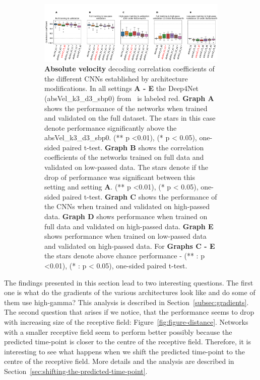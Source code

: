 \begin{itemize}
\begin{figure}[!htpb]
\begin{subfigure}[b]{\textwidth}
   \includegraphics[width=1\linewidth]{img/ch4/original_setting_absVel_performance_comparison}
   \caption{\textbf{Absolute velocity} decoding correlation coefficients of the different CNNs established by architecture modifications. In all settings \textbf{
   A - E} the Deep4Net (absVel\_k3\_d3\_sbp0) from~\cite{Hammer-2021} is labeled red. \textbf{Graph A} shows the performance of the networks when trained and validated on the full dataset. The stars in this case denote performance significantly above the absVel\_k3\_d3\_sbp0. (** p <0.01), (* p < 0.05), one-sided paired t-test.
   \textbf{Graph B} shows the correlation coefficients of the networks trained on full data and validated on low-passed data. 
   The stars denote if the drop of performance was significant between this setting and setting \textbf{A}. (** p <0.01), (* p < 0.05), one-sided paired t-test.
   \textbf{Graph C} shows the performance of the CNNs when trained and validated on high-passed data. \textbf{Graph D} shows performance when trained on full data and validated on high-passed data. \textbf{Graph E} shows performance when trained on low-passed data and validated on high-passed data. For \textbf{Graphs C - E} the stars denote above chance performance - (** : p <0.01), (* : p < 0.05), one-sided paired t-test.}
   \label{fig:original-performances-absolute-velocity}
\end{subfigure}
\caption[]{}
\label{fig:original-performances}
\end{figure}


\end{itemize}

The findings presented in this section lead to two interesting questions.
The first one  is what do the gradients of the various architectures look like and do some of them use high-gamma?
This analysis is described in Section~\ref{subsec:gradients}.
The second question that arises if we notice, that the performance seems to drop with increasing size of the receptive field: Figure~\ref{fig:figure-distance}.
Networks with a smaller receptive field seem to perform better possibly because the predicted time-point is closer to the centre of the receptive field.
Therefore, it is interesting to see what happens when we shift the predicted time-point to the centre of the receptive field.
More details and the analysis are described in Section~\ref{sec:shifting-the-predicted-time-point}.

